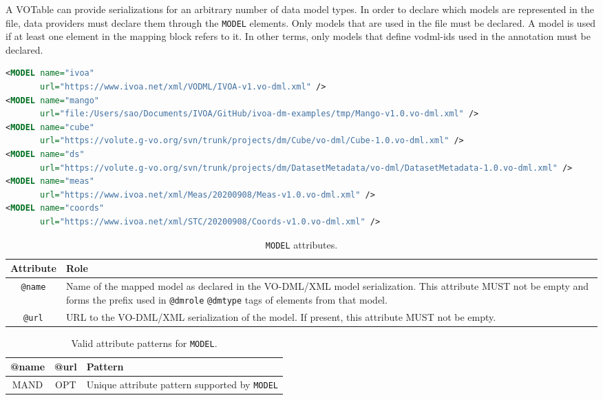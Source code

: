 A VOTable can provide serializations for an arbitrary number of data model
types. In order to declare which models are represented in the file, data
providers must declare them through the \texttt{MODEL} elements.
Only models that are used in the file must be declared. A model is
used if at least one element in the mapping block refers to it. In other terms, only models that define vodml-ids used in the
annotation must be declared.

\begin{lstlisting}[caption={Example \texttt{MODEL} mapping block. (see in context line \ref{MODEL_snippet}) },language=XML]
<MODEL name="ivoa"   
       url="https://www.ivoa.net/xml/VODML/IVOA-v1.vo-dml.xml" />
<MODEL name="mango"
       url="file:/Users/sao/Documents/IVOA/GitHub/ivoa-dm-examples/tmp/Mango-v1.0.vo-dml.xml" />
<MODEL name="cube"
       url="https://volute.g-vo.org/svn/trunk/projects/dm/Cube/vo-dml/Cube-1.0.vo-dml.xml" />
<MODEL name="ds"
       url="https://volute.g-vo.org/svn/trunk/projects/dm/DatasetMetadata/vo-dml/DatasetMetadata-1.0.vo-dml.xml" />
<MODEL name="meas"
       url="https://www.ivoa.net/xml/Meas/20200908/Meas-v1.0.vo-dml.xml" />
<MODEL name="coords"
       url="https://www.ivoa.net/xml/STC/20200908/Coords-v1.0.vo-dml.xml" />
\end{lstlisting}

\begin{table}[!htbp]
  \small
  \centering
  \begin{tabulary}{\linewidth}{|c|J|}       
    \hline 
         \textbf{Attribute} & 
         \textbf {Role}\\
    \hline
    \hline  
         \texttt{@name}  & 
         Name of the mapped model as declared in the VO-DML/XML model serialization.  This attribute MUST not be empty and forms the prefix used in  \texttt{@dmrole}  \texttt{@dmtype} tags of elements from that model.  \\
    \hline 
         \texttt{@url} & 
         URL to the VO-DML/XML serialization of the model. If present, this attribute MUST not be empty.\\
    \hline 
  \end{tabulary}
  \caption{\texttt{MODEL} attributes.} 
  \label{tbl:model-att}
\end{table}


\begin{table}[!htbp]
  \small
  \centering
  \begin{tabulary}{\linewidth}{|c |c |J|}
    \hline 
        \textbf{@name} &
        \textbf{@url} &
        \textbf{Pattern}\\
    \hline      \hline  
        MAND &           
        OPT &           
        Unique attribute pattern supported by \texttt{MODEL}\\
    \hline 
  \end{tabulary}
  \caption{Valid attribute patterns for  \texttt{MODEL}.} 
  \label{tbl:model-pattern}
\end{table}
